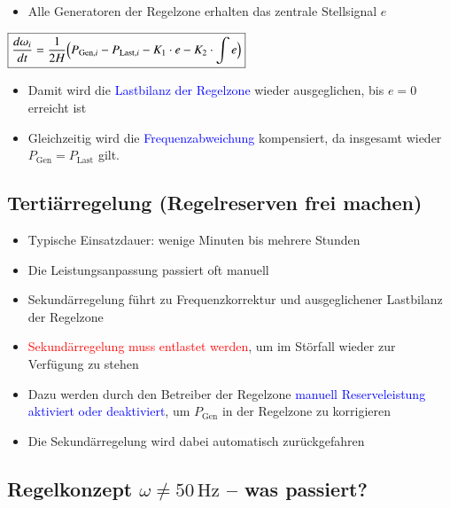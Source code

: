 \vspace{0.15cm}

\begin{itemize}
    \item Alle Generatoren der Regelzone erhalten das zentrale Stellsignal \( e \)
\end{itemize}

\vspace{0.15cm}

$\boxed{
\frac{d\omega_i}{dt} = \frac{1}{2H} \Bigl( P_{\text{Gen},i} - P_{\text{Last},i} - K_1 \cdot e - K_2 \cdot \int e \Bigr)}
$

\vspace{0.15cm}

\begin{itemize}
    \item Damit wird die \textcolor{blue}{Lastbilanz der Regelzone} wieder ausgeglichen, bis \( e = 0 \) erreicht ist
    \item Gleichzeitig wird die \textcolor{blue}{Frequenzabweichung} kompensiert, da insgesamt wieder \( P_{\text{Gen}} = P_{\text{Last}} \) gilt.
\end{itemize}


\subsection{Tertiärregelung (Regelreserven frei machen)}
\begin{itemize}
    \item Typische Einsatzdauer: wenige Minuten bis mehrere Stunden
    \item Die Leistungsanpassung passiert oft manuell
    \item Sekundärregelung führt zu Frequenzkorrektur und ausgeglichener Lastbilanz der Regelzone
    \item \textcolor{red}{Sekundärregelung muss entlastet werden}, um im Störfall wieder zur Verfügung zu stehen
    \item Dazu werden durch den Betreiber der Regelzone \textcolor{blue}{manuell Reserveleistung aktiviert oder deaktiviert}, um \( P_{\text{Gen}} \) in der Regelzone zu korrigieren
    \item Die Sekundärregelung wird dabei automatisch zurückgefahren
\end{itemize}


\subsection{\texorpdfstring{Regelkonzept $\omega \neq 50\,\mathrm{Hz}$ – was passiert?}
                           {Regelkonzept omega ≠ 50 Hz – was passiert?}}

